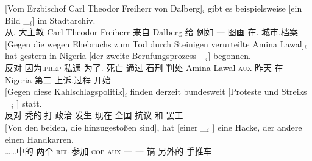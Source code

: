 \begin{sloppypar}
\ex\label{bsp-von-erzbischof-bilder} 
\gll {}[Vom Erzbischof Carl Theodor Freiherr von Dalberg]$_i$ gibt es beispielsweise [ein Bild \_$_i$]
        im Stadtarchiv.\footnotemark\\
	{}\spacebr{}从. 大主教 Carl Theodor Freiherr 来自 Dalberg 给 \expl{} 例如 \spacebr{}一 图画 {} 在. 城市.档案\\
\ex 
\gll {}[Gegen die wegen Ehebruchs zum Tod durch Steinigen verurteilte Amina Lawal]$_i$ hat gestern in Nigeria
    [der zweite Berufungsprozess \_$_i$] begonnen.\footnotemark\\
	{}\spacebr{}反对  因为.\textsc{prep} 私通 为了. 死亡 通过 石刑 判处 Amina Lawal \textsc{aux} 昨天 在 Nigeria \spacebr{} 第二 上诉.过程 {} 开始\\
\ex 
\gll {}[Gegen                  diese        Kahlschlagspolitik]$_i$ finden derzeit bundesweit                     [Proteste und Streiks \_$_i$ ] statt.\footnotemark\\
     {}\spacebr{}反对  秃的.打.政治    发生   现在 \spacebr{}全国 \spacebr{}抗议 和 罢工 {} {} \prt{}\\
\ex 
\gll {}[Von den beiden, die hinzugestoßen sind], hat [einer        \_$_i$ ] eine Hacke, der andere einen Handkarren.\footnotemark\\
	 {}\spacebr{}……中的  两个 \textsc{rel} 参加 \textsc{cop} \textsc{aux} \spacebr{}一 {}    {}  一 镐    另外的  手推车\\

\end{sloppypar}
